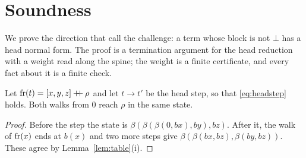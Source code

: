 
\section{Soundness}\label{sec:soundness}

We prove the direction that \citet[Question~10]{dots} call the challenge: a term whose
block is not $\bot$ has a head normal form. The proof is a termination argument for the
head reduction with a weight read along the spine; the weight is a finite certificate, and
every fact about it is a finite check.

\begin{lemma}[window]\label{lem:window}
Let $\operatorname{fr}(t)=[x,y,z]\mathbin{+\!\!+}\rho$ and let $t\to t'$ be the head step, so that
\eqref{eq:headstep} holds. Both walks from
$0$ reach $\rho$ in the same state.
\end{lemma}
\begin{proof}
Before the step the state is $\beta(\beta(\beta(0,b x),b y),b z)$. After it, the walk of
$\operatorname{fr}(x)$ ends at $b(x)$ and two more steps give
$\beta(\beta(b x,b z),\beta(b y,b z))$. These agree by Lemma~\ref{lem:table}(i).
\end{proof}

